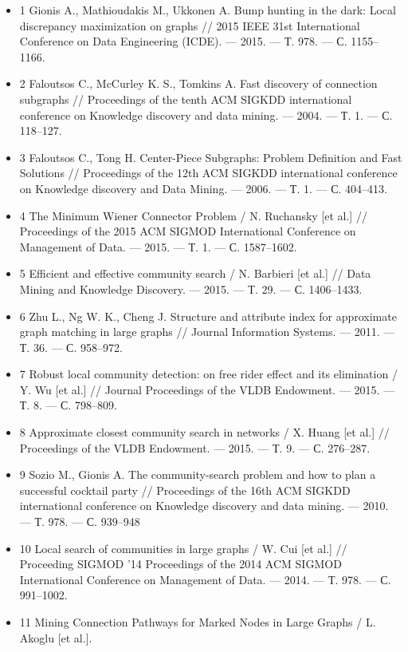 \documentclass[11pt,a4paper,oneside]{article}
\begin{document}
\begin{itemize}
    \item 1  Gionis A., Mathioudakis M., Ukkonen A. Bump hunting in the dark: Local discrepancy maximization on graphs // 2015 IEEE 31st International Conference on Data Engineering (ICDE). — 2015. — Т. 978. — С. 1155–1166.
    \item 2  Faloutsos C., McCurley K. S., Tomkins A. Fast discovery of connection subgraphs // Proceedings of the tenth ACM SIGKDD international conference on Knowledge discovery and data mining. — 2004. — Т. 1. — С. 118–127.
    \item 3  Faloutsos C., Tong H. Center-Piece Subgraphs: Problem Definition and Fast Solutions // Proceedings of the 12th ACM SIGKDD international conference on Knowledge discovery and Data Mining. — 2006. — Т. 1. — С. 404–413.
    \item 4  The Minimum Wiener Connector Problem / N. Ruchansky [et al.] // Proceedings of the 2015 ACM SIGMOD International Conference on Management of Data. — 2015. — Т. 1. — С. 1587–1602.
    \item 5  Efficient and effective community search / N. Barbieri [et al.] // Data Mining and Knowledge Discovery. — 2015. — Т. 29. — С. 1406–1433.
    \item 6  Zhu L., Ng W. K., Cheng J. Structure and attribute index for approximate graph matching in large graphs // Journal Information Systems. — 2011. — Т. 36. — С. 958–972.
    \item 7  Robust local community detection: on free rider effect and its elimination / Y. Wu [et al.] // Journal Proceedings of the VLDB Endowment. — 2015. — Т. 8. — С. 798–809.
    \item 8  Approximate closest community search in networks / X. Huang [et al.] // Proceedings of the VLDB Endowment. — 2015. — Т. 9. — С. 276–287.
    \item 9  Sozio M., Gionis A. The community-search problem and how to plan a successful cocktail party // Proceedings of the 16th ACM SIGKDD international conference on Knowledge discovery and data mining. — 2010. — Т. 978. — С. 939–948
    \item 10 Local search of communities in large graphs / W. Cui [et al.] // Proceeding SIGMOD ’14 Proceedings of the 2014 ACM SIGMOD International Conference on Management of Data. — 2014. — Т. 978. — С. 991–1002.
    \item 11 Mining Connection Pathways for Marked Nodes in Large Graphs / L. Akoglu [et al.].
\end{itemize}
\end{document}
